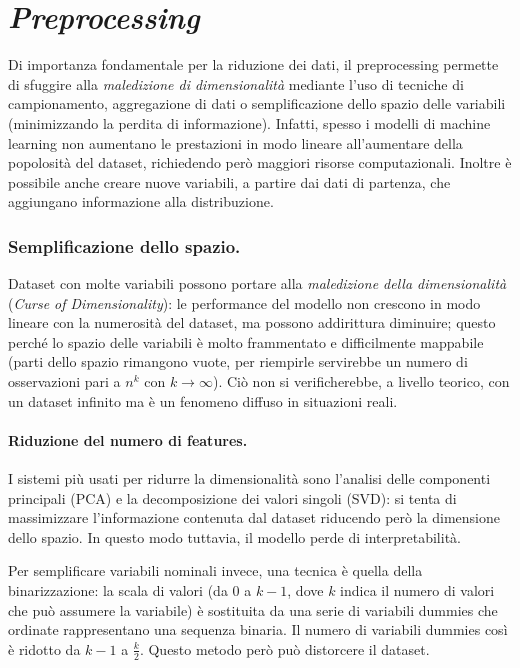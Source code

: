 \documentclass[11pt, a4page, twocolumn]{article}
\begin{document}
\newpage
\part{\textit{Preprocessing}}
Di importanza fondamentale per la riduzione dei dati, il preprocessing permette di sfuggire alla \textit{maledizione di dimensionalità} mediante l'uso di tecniche di campionamento, aggregazione di dati o semplificazione dello spazio delle variabili (minimizzando la perdita di informazione).
Infatti, spesso i modelli di machine learning non aumentano le prestazioni in modo lineare all'aumentare della popolosità del dataset, richiedendo però maggiori risorse computazionali.
Inoltre è possibile anche creare nuove variabili, a partire dai dati di partenza, che aggiungano informazione alla distribuzione.


\section{Semplificazione dello spazio.}
Dataset con molte variabili possono portare alla \textit{maledizione della dimensionalità} (\textit{Curse of Dimensionality}): le performance del modello non crescono in modo lineare con la numerosità del dataset, ma possono addirittura diminuire; questo perché lo spazio delle variabili è molto frammentato e difficilmente mappabile (parti dello spazio rimangono vuote, per riempirle servirebbe un numero di osservazioni pari a $n^k$ con $k \to \infty$).
Ciò non si verificherebbe, a livello teorico, con un dataset infinito ma è un fenomeno diffuso in situazioni reali.

\subsection{Riduzione del numero di features.}
I sistemi più usati per ridurre la dimensionalità sono l'analisi delle componenti principali (PCA) e la decomposizione dei valori singoli (SVD): si tenta di massimizzare l'informazione contenuta dal dataset riducendo però la dimensione dello spazio.
In questo modo tuttavia, il modello perde di interpretabilità.

Per semplificare variabili nominali invece, una tecnica è quella della binarizzazione: la scala di valori (da $0$ a $k-1$, dove $k$ indica il numero di valori che può assumere la variabile) è sostituita da una serie di variabili dummies che ordinate rappresentano una sequenza binaria.
Il numero di variabili dummies così è ridotto da $k-1$ a $\frac{k}{2}$.
Questo metodo però può distorcere il dataset.
\end{document}
